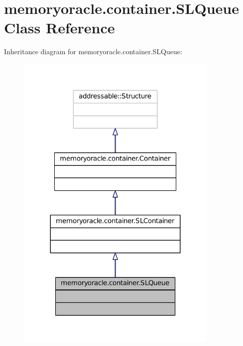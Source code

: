 \hypertarget{classmemoryoracle_1_1container_1_1SLQueue}{}\section{memoryoracle.\+container.\+S\+L\+Queue Class Reference}
\label{classmemoryoracle_1_1container_1_1SLQueue}


Inheritance diagram for memoryoracle.\+container.\+S\+L\+Queue\+:\nopagebreak
\begin{figure}[H]
\begin{center}
\leavevmode
\includegraphics[width=275pt]{classmemoryoracle_1_1container_1_1SLQueue__inherit__graph}
\end{center}
\end{figure}


